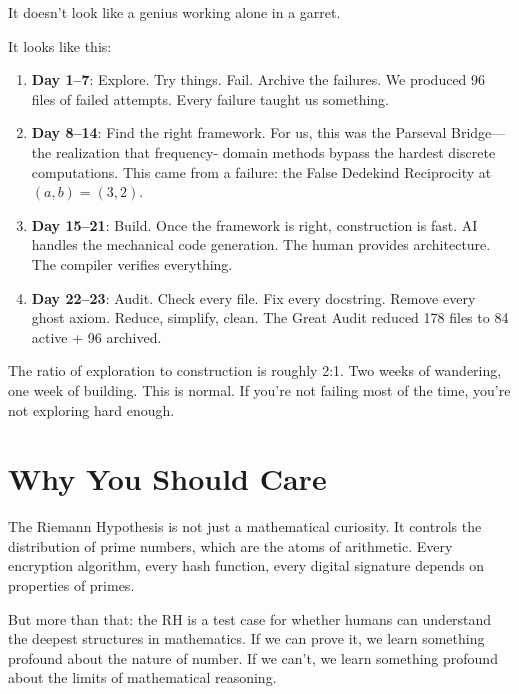 \documentclass[11pt,a4paper]{article}
\begin{document}
It doesn't look like a genius working alone in a garret.

It looks like this:

\begin{enumerate}
  \item \textbf{Day 1--7}: Explore. Try things. Fail. Archive
    the failures. We produced 96 files of failed attempts. Every
    failure taught us something.

  \item \textbf{Day 8--14}: Find the right framework. For us,
    this was the Parseval Bridge---the realization that frequency-
    domain methods bypass the hardest discrete computations. This
    came from a failure: the False Dedekind Reciprocity at
    $(a,b) = (3,2)$.

  \item \textbf{Day 15--21}: Build. Once the framework is right,
    construction is fast. AI handles the mechanical code generation.
    The human provides architecture. The compiler verifies
    everything.

  \item \textbf{Day 22--23}: Audit. Check every file. Fix every
    docstring. Remove every ghost axiom. Reduce, simplify, clean.
    The Great Audit reduced 178 files to 84 active + 96 archived.
\end{enumerate}

The ratio of exploration to construction is roughly 2:1. Two weeks
of wandering, one week of building. This is normal. If you're not
failing most of the time, you're not exploring hard enough.

\section*{Why You Should Care}

The Riemann Hypothesis is not just a mathematical curiosity. It
controls the distribution of prime numbers, which are the atoms
of arithmetic. Every encryption algorithm, every hash function,
every digital signature depends on properties of primes.

But more than that: the RH is a test case for whether humans can
understand the deepest structures in mathematics. If we can prove
it, we learn something profound about the nature of number. If we
can't, we learn something profound about the limits of mathematical
reasoning.
\end{document}
